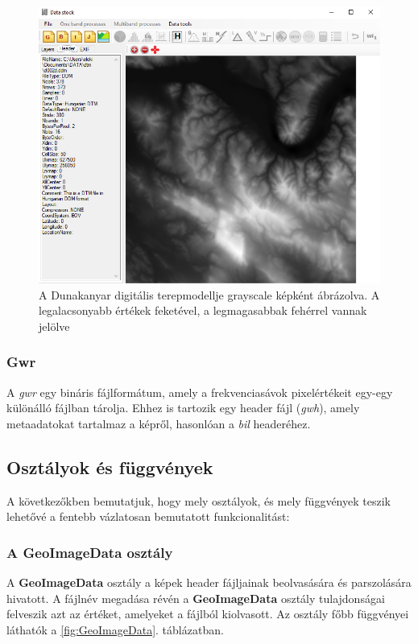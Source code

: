 \documentclass[a4paper,12pt]{article}
\begin{document}
\begin{figure}
	\centering
	\includegraphics[width=14cm]{ddm1.png}
	\caption{A Dunakanyar digitális terepmodellje grayscale képként ábrázolva. A legalacsonyabb értékek feketével, a legmagasabbak fehérrel vannak jelölve}
	\label{fig:ddm1}
\end{figure}

\subsubsection{Gwr}

A \textit{gwr} egy bináris fájlformátum, amely a frekvenciasávok pixelértékeit egy-egy különálló fájlban tárolja. Ehhez is tartozik egy header fájl (\textit{gwh}), amely metaadatokat tartalmaz a képről, hasonlóan a \textit{bil} headeréhez.



\subsection{Osztályok és függvények}

A következőkben bemutatjuk, hogy mely osztályok, és mely függvények teszik lehetővé a fentebb vázlatosan bemutatott funkcionalitást:

\subsubsection{A \textbf{GeoImageData} osztály}

A \textbf{GeoImageData} osztály a képek header fájljainak beolvasására és parszolására hivatott. A fájlnév megadása révén a \textbf{GeoImageData} osztály tulajdonságai felveszik azt az értéket, amelyeket a fájlból kiolvasott. Az osztály főbb függvényei láthatók a \ref{fig:GeoImageData}. táblázatban.
\end{document}
